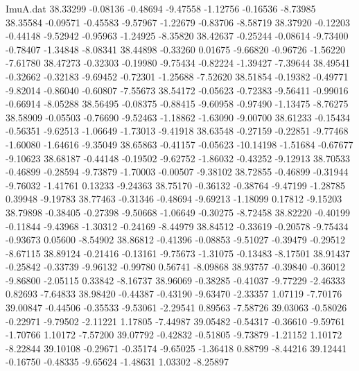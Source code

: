 \begin{filecontents}{ImuA.dat}
  38.33299   -0.08136   -0.48694   -9.47558   -1.12756   -0.16536   -8.73985
  38.35584   -0.09571   -0.45583   -9.57967   -1.22679   -0.83706   -8.58719
  38.37920   -0.12203   -0.44148   -9.52942   -0.95963   -1.24925   -8.35820
  38.42637   -0.25244   -0.08614   -9.73400   -0.78407   -1.34848   -8.08341
  38.44898   -0.33260    0.01675   -9.66820   -0.96726   -1.56220   -7.61780
  38.47273   -0.32303   -0.19980   -9.75434   -0.82224   -1.39427   -7.39644
  38.49541   -0.32662   -0.32183   -9.69452   -0.72301   -1.25688   -7.52620
  38.51854   -0.19382   -0.49771   -9.82014   -0.86040   -0.60807   -7.55673
  38.54172   -0.05623   -0.72383   -9.56411   -0.99016   -0.66914   -8.05288
  38.56495   -0.08375   -0.88415   -9.60958   -0.97490   -1.13475   -8.76275
  38.58909   -0.05503   -0.76690   -9.52463   -1.18862   -1.63090   -9.00700
  38.61233   -0.15434   -0.56351   -9.62513   -1.06649   -1.73013   -9.41918
  38.63548   -0.27159   -0.22851   -9.77468   -1.60080   -1.64616   -9.35049
  38.65863   -0.41157   -0.05623  -10.14198   -1.51684   -0.67677   -9.10623
  38.68187   -0.44148   -0.19502   -9.62752   -1.86032   -0.43252   -9.12913
  38.70533   -0.46899   -0.28594   -9.73879   -1.70003   -0.00507   -9.38102
  38.72855   -0.46899   -0.31944   -9.76032   -1.41761    0.13233   -9.24363
  38.75170   -0.36132   -0.38764   -9.47199   -1.28785    0.39948   -9.19783
  38.77463   -0.31346   -0.48694   -9.69213   -1.18099    0.17812   -9.15203
  38.79898   -0.38405   -0.27398   -9.50668   -1.06649   -0.30275   -8.72458
  38.82220   -0.40199   -0.11844   -9.43968   -1.30312   -0.24169   -8.44979
  38.84512   -0.33619   -0.20578   -9.75434   -0.93673    0.05600   -8.54902
  38.86812   -0.41396   -0.08853   -9.51027   -0.39479   -0.29512   -8.67115
  38.89124   -0.21416   -0.13161   -9.75673   -1.31075   -0.13483   -8.17501
  38.91437   -0.25842   -0.33739   -9.96132   -0.99780    0.56741   -8.09868
  38.93757   -0.39840   -0.36012   -9.86800   -2.05115    0.33842   -8.16737
  38.96069   -0.38285   -0.41037   -9.77229   -2.46333    0.82693   -7.64833
  38.98420   -0.44387   -0.43190   -9.63470   -2.33357    1.07119   -7.70176
  39.00847   -0.44506   -0.35533   -9.53061   -2.29541    0.89563   -7.58726
  39.03063   -0.58026   -0.22971   -9.79502   -2.11221    1.17805   -7.44987
  39.05482   -0.54317   -0.36610   -9.59761   -1.70766    1.10172   -7.57200
  39.07792   -0.42832   -0.51805   -9.73879   -1.21152    1.10172   -8.22844
  39.10108   -0.29671   -0.35174   -9.65025   -1.36418    0.88799   -8.44216
  39.12441   -0.16750   -0.48335   -9.65624   -1.48631    1.03302   -8.25897

\end{filecontents}
